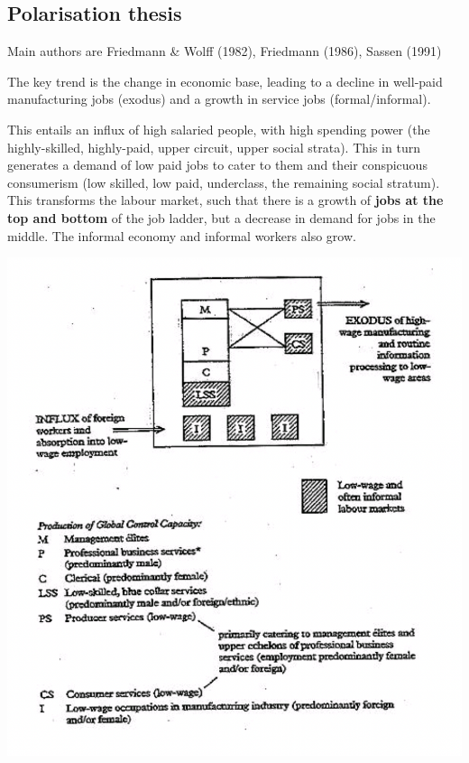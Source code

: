\documentclass{article}
\begin{document}
\subsection{Polarisation thesis}

Main authors are Friedmann \& Wolff (1982), Friedmann (1986), Sassen (1991)

The key trend is the change in economic base, leading to a decline in well-paid manufacturing jobs (exodus) and a growth in service jobs (formal/informal).

This entails an influx of high salaried people, with high spending power (the highly-skilled, highly-paid, upper circuit, upper social strata). This in turn generates a demand of low paid jobs to cater to them  and their conspicuous consumerism (low skilled, low paid, underclass, the remaining social stratum).
This transforms the labour market, such that there is a growth of \textbf{jobs at the top and bottom} of the job ladder, but a decrease in demand for jobs in the middle. The informal economy and informal workers also grow.

\begin{center}
\includegraphics[width=40em]{polarisation_thesis}
\end{center}
\end{document}
